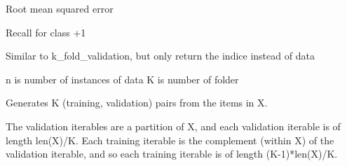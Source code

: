 \documentclass[letterpaper,10pt,english]{sphinxmanual}
\begin{document}
\begin{fulllineitems}
\label{pyGPs.Validation:pyGPs.Validation.valid.RMSE}
Root mean squared error

\end{fulllineitems}


\begin{fulllineitems}
\label{pyGPs.Validation:pyGPs.Validation.valid.Recall}
Recall for class +1

\end{fulllineitems}


\begin{fulllineitems}
\label{pyGPs.Validation:pyGPs.Validation.valid.k_fold_index}
Similar to k\_fold\_validation,
but only return the indice instead of data

n is number of instances of data
K is number of folder

\end{fulllineitems}


\begin{fulllineitems}
\label{pyGPs.Validation:pyGPs.Validation.valid.k_fold_validation}
Generates K (training, validation) pairs from the items in X.

The validation iterables are a partition of X, and each validation
iterable is of length len(X)/K. Each training iterable is the
complement (within X) of the validation iterable, and so each training
iterable is of length (K-1)*len(X)/K.

\end{fulllineitems}
\end{document}
